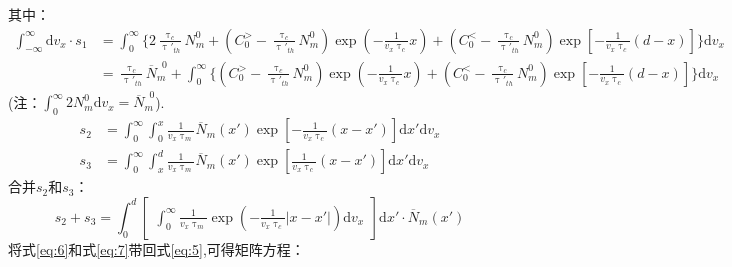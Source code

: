 \documentclass{article}
\begin{document}
	其中：
	\begin{equation}\label{eq:6}
		\begin{aligned}
			\int_{-\infty}^{\infty}\mathrm{d}v_x\cdot s_1&=\int_0^{\infty}\{2\frac{\uptau_c}{\uptau'_{th}}N_m^0+(C_0^>-\frac{\uptau_c}{\uptau'_{th}}N_m^0)\exp(-\frac{1}{v_x\uptau_c}x)+(C_0^<-\frac{\uptau_c}{\uptau'_{th}}N_m^0)\exp[-\frac{1}{v_x\uptau_c}(d-x)]\}\mathrm{d}v_x\\
			&=\frac{\uptau_c}{\uptau'_{th}}\overline{N}_m^{\phantom{0}0}+\int_0^{\infty}\{(C_0^>-\frac{\uptau_c}{\uptau'_{th}}N_m^0)\exp(-\frac{1}{v_x\uptau_c}x)+(C_0^<-\frac{\uptau_c}{\uptau'_{th}}N_m^0)\exp[-\frac{1}{v_x\uptau_c}(d-x)]\}\mathrm{d}v_x
		\end{aligned}
	\end{equation}
	\phantom{aaaaaaaaaaaaaaaaaaaaaaaaaaaaaaaaaaaaaaaaaaaaaaaaaaa}(注：$\displaystyle\int_0^{\infty}2N_m^0\mathrm{d}v_x=\overline{N}_m^{\phantom{0}0}$).
	\[
		\begin{aligned}
			s_2&=\int_0^{\infty}\int_0^x\frac{1}{v_x\uptau_m}\overline{N}_m(x')\exp[-\frac{1}{v_x\uptau_c}(x-x')]\mathrm{d}x'\mathrm{d}v_x	\\
			s_3&=\int_0^{\infty}\int_x^d\frac{1}{v_x\uptau_m}\overline{N}_m(x')\exp[\frac{1}{v_x\uptau_c}(x-x')]\mathrm{d}x'\mathrm{d}v_x	
		\end{aligned}
	\]
	合并$s_2$和$s_3$：
	\begin{equation}\label{eq:7}
		s_2+s_3=\int_0^d\begin{bmatrix}\displaystyle\int_0^{\infty}\frac{1}{v_x\uptau_m}\exp(-\frac{1}{v_x\uptau_c}|x-x'|)\mathrm{d}v_x\end{bmatrix}\mathrm{d}x'\cdot\overline{N}_m(x')
	\end{equation}
	将式\eqref{eq:6}和式\eqref{eq:7}带回式\eqref{eq:5},可得矩阵方程：
\end{document}
